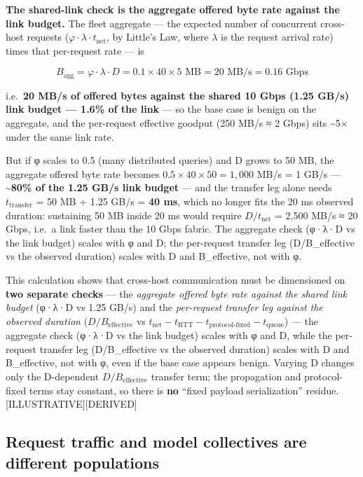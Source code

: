 \textbf{The shared-link check is the aggregate offered byte rate against
the link budget.} The fleet aggregate --- the expected number of
concurrent cross-host requests
(\(\varphi \cdot \lambda \cdot t_\text{net}\), by Little's Law, where
\(\lambda\) is the request arrival rate) times that per-request rate ---
is

\[
B_\text{agg} = \varphi \cdot \lambda \cdot D = 0.1 \times 40 \times 5\text{ MB} = 20\text{ MB/s} = 0.16\text{ Gbps}
\]

i.e.~\textbf{20 MB/s of offered bytes against the shared 10 Gbps (1.25
GB/s) link budget --- 1.6\% of the link} --- so the base case is benign
on the aggregate, and the per-request effective goodput (250 MB/s ≈ 2
Gbps) sits \textasciitilde5× under the same link rate.

But if φ scales to 0.5 (many distributed queries) and D grows to 50 MB,
the aggregate offered byte rate becomes
\(0.5 \times 40 \times 50 = 1{,}000\) MB/s = 1 GB/s ---
\textbf{\textasciitilde80\% of the 1.25 GB/s link budget} --- and the
transfer leg alone needs \(t_\text{transfer}\) = 50 MB ÷ 1.25 GB/s =
\textbf{40 ms}, which no longer fits the 20 ms observed duration:
sustaining 50 MB inside 20 ms would require \(D/t_\text{net}\) = 2,500
MB/s ≈ 20 Gbps, i.e.~a link faster than the 10 Gbps fabric. The
aggregate check (φ·λ·D vs the link budget) scales with φ and D; the
per-request transfer leg (D/B\_effective vs the observed duration)
scales with D and B\_effective, not with φ.

This calculation shows that cross-host communication must be dimensioned
on \textbf{two separate checks} --- the \emph{aggregate offered byte
rate against the shared link budget} (φ·λ·D vs 1.25 GB/s) and the
\emph{per-request transfer leg against the observed duration}
(\(D/B_\text{effective}\) vs
\(t_\text{net} - t_\text{RTT} - t_\text{protocol-fixed} - t_\text{queue}\))
--- the aggregate check (φ·λ·D vs the link budget) scales with φ and D,
while the per-request transfer leg (D/B\_effective vs the observed
duration) scales with D and B\_effective, not with φ, even if the base
case appears benign. Varying D changes only the D-dependent
\(D/B_\text{effective}\) transfer term; the propagation and
protocol-fixed terms stay constant, so there is \textbf{no} ``fixed
payload serialization'' residue. \mbox{{[}ILLUSTRATIVE{]}}\hspace{0pt}\mbox{{[}DERIVED{]}}

\subsection{Request traffic and model collectives are different
populations}\label{request-traffic-and-model-collectives-are-different-populations}

